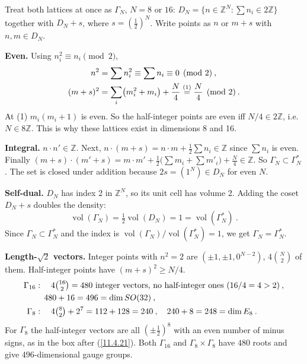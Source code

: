 \begin{tcolorbox}[breakable]
	\begin{remark}
		Treat both lattices at once as $\Gamma_{N}$, $N=8$ or $16$: $D_{N}=\{n\in\mathds{Z}^{N}:\sum n_{i}\in2\mathds{Z}\}$ together with $D_{N}+s$, where $s=(\frac{1}{2})^{N}$. Write points as $n$ or $m+s$ with $n,m\in D_{N}$.

		\textbf{Even.} Using $n_{i}^{2}\equiv n_{i}\pmod 2$,
		\begin{align*}
			n^{2}&=\sum n_{i}^{2}\equiv\sum n_{i}\equiv0\pmod2\:,\\
			(m+s)^{2}&=\sum_{i}\bigl(m_{i}^{2}+m_{i}\bigr)+\frac{N}{4}\overset{(1)}{=}\frac{N}{4}\pmod 2\:.
		\end{align*}
		At (1) $m_{i}(m_{i}+1)$ is even. So the half-integer points are even iff $N/4\in2\mathds{Z}$, i.e.\ $N\in8\mathds{Z}$. This is why these lattices exist in dimensions 8 and 16.

		\textbf{Integral.} $n\cdot n'\in\mathds{Z}$. Next, $n\cdot(m+s)=n\cdot m+\frac{1}{2}\sum n_{i}\in\mathds{Z}$ since $\sum n_{i}$ is even. Finally $(m+s)\cdot(m'+s)=m\cdot m'+\frac{1}{2}\bigl(\sum m_{i}+\sum m'_{i}\bigr)+\frac{N}{4}\in\mathds{Z}$. So $\Gamma_{N}\subset\Gamma_{N}^{\ast}$. The set is closed under addition because $2s=(1^{N})\in D_{N}$ for even $N$.

		\textbf{Self-dual.} $D_{N}$ has index 2 in $\mathds{Z}^{N}$, so its unit cell has volume 2. Adding the coset $D_{N}+s$ doubles the density:
		\begin{equation*}
			\operatorname{vol}(\Gamma_{N})=\tfrac{1}{2}\operatorname{vol}(D_{N})=1=\operatorname{vol}(\Gamma_{N}^{\ast})\:.
		\end{equation*}
		Since $\Gamma_{N}\subset\Gamma_{N}^{\ast}$ and the index is $\operatorname{vol}(\Gamma_{N})/\operatorname{vol}(\Gamma_{N}^{\ast})=1$, we get $\Gamma_{N}=\Gamma_{N}^{\ast}$.

		\textbf{Length-$\sqrt{2}$ vectors.} Integer points with $n^{2}=2$ are $(\pm1,\pm1,0^{N-2})$, $4\binom{N}{2}$ of them. Half-integer points have $(m+s)^{2}\geq N/4$.
		\begin{align*}
			\Gamma_{16}&:\quad 4\tbinom{16}{2}=480\ \text{integer vectors, no half-integer ones }(16/4=4>2)\:,\\
			&\quad 480+16=496=\operatorname{dim}SO(32)\:,\\
			\Gamma_{8}&:\quad 4\tbinom{8}{2}+2^{7}=112+128=240\:,\quad 240+8=248=\operatorname{dim}E_{8}\:.
		\end{align*}
		For $\Gamma_{8}$ the half-integer vectors are all $(\pm\frac{1}{2})^{8}$ with an even number of minus signs, as in the box after (\ref{11.4.21}). Both $\Gamma_{16}$ and $\Gamma_{8}\times\Gamma_{8}$ have $480$ roots and give $496$-dimensional gauge groups.
	\end{remark}
\end{tcolorbox}


